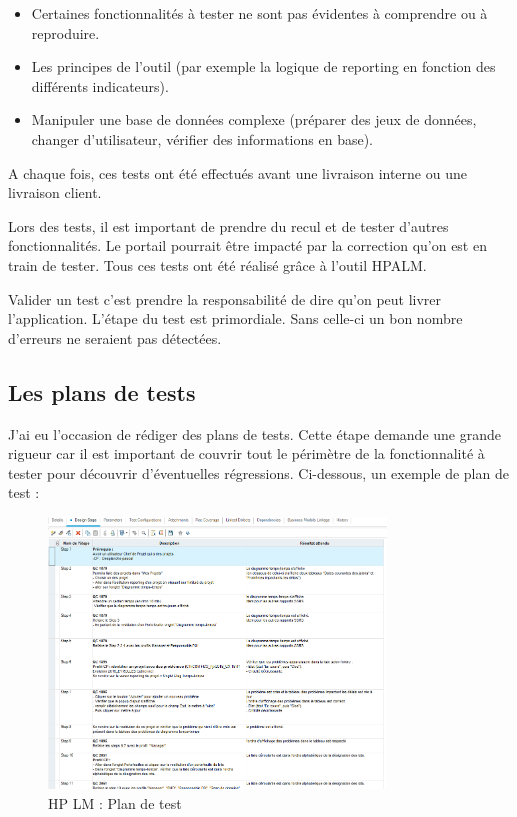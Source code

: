 \begin{itemize}
    \item Certaines fonctionnalités à tester ne sont pas évidentes à comprendre ou à reproduire.
    \item Les principes de l'outil (par exemple la logique de reporting en fonction des différents indicateurs).
    \item Manipuler une base de données complexe (préparer des jeux de données, changer d'utilisateur, vérifier des informations en base).
\end{itemize}

A chaque fois, ces tests ont été effectués avant une livraison interne ou une livraison client.

Lors des tests, il est important de prendre du recul et de tester d'autres fonctionnalités. Le portail pourrait être impacté par la correction qu'on est en train de tester. Tous ces tests ont été réalisé grâce à l'outil HPALM.
        
Valider un test c'est prendre la responsabilité de dire qu'on peut livrer l'application. L'étape du test est primordiale. Sans celle-ci un bon nombre d'erreurs ne seraient pas détectées.

\subsection{Les plans de tests}

J'ai eu l'occasion de rédiger des plans de tests. Cette étape demande une grande rigueur car il est important de couvrir tout le périmètre de la fonctionnalité à tester pour découvrir d'éventuelles régressions. Ci-dessous, un exemple de plan de test :

\begin{figure}[!h]
\centering
\includegraphics[width=0.8\textwidth]{images/HPLMplantest.png}
\caption{HP LM : Plan de test}
\end{figure}

